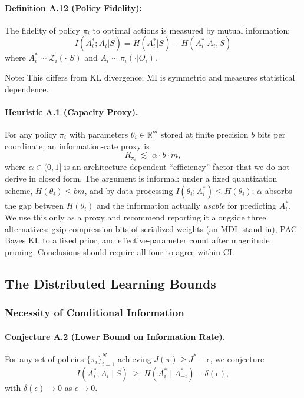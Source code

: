 \documentclass[10pt, letterpaper]{article}
\begin{document}
\paragraph{Definition A.12 (Policy Fidelity):} The fidelity of policy $\pi_i$ to optimal actions is measured by mutual information:
\[I(A_i^*; A_i | S) = H(A_i^*|S) - H(A_i^*|A_i, S)\]
where $A_i^* \sim \mathcal{Z}_i(\cdot|S)$ and $A_i \sim \pi_i(\cdot|O_i)$.

Note: This differs from KL divergence; MI is symmetric and measures statistical dependence.

\paragraph{Heuristic A.1 (Capacity Proxy).} For any policy $\pi_i$ with parameters $\theta_i \in \mathbb{R}^m$ stored at finite precision $b$ bits per coordinate, an information-rate proxy is
\[R_{\pi_i} \;\lesssim\; \alpha \cdot b \cdot m,\]
where $\alpha \in (0,1]$ is an architecture-dependent ``efficiency'' factor that we do not derive in closed form. The argument is informal: under a fixed quantization scheme, $H(\theta_i) \leq bm$, and by data processing $I(\theta_i; A_i^*) \leq H(\theta_i)$; $\alpha$ absorbs the gap between $H(\theta_i)$ and the information actually \emph{usable} for predicting $A_i^*$. We use this only as a proxy and recommend reporting it alongside three alternatives: gzip-compression bits of serialized weights (an MDL stand-in), PAC-Bayes KL to a fixed prior, and effective-parameter count after magnitude pruning. Conclusions should require all four to agree within CI.

\subsection{The Distributed Learning Bounds}

\subsubsection{Necessity of Conditional Information}

\paragraph{Conjecture A.2 (Lower Bound on Information Rate).} For any set of policies $\{\pi_i\}_{i=1}^N$ achieving $J(\pi) \geq J^* - \epsilon$, we conjecture
\[I(A_i^*; A_i \mid S) \;\geq\; H(A_i^* \mid A_{-i}^*) - \delta(\epsilon),\]
with $\delta(\epsilon) \to 0$ as $\epsilon \to 0$.
\end{document}
